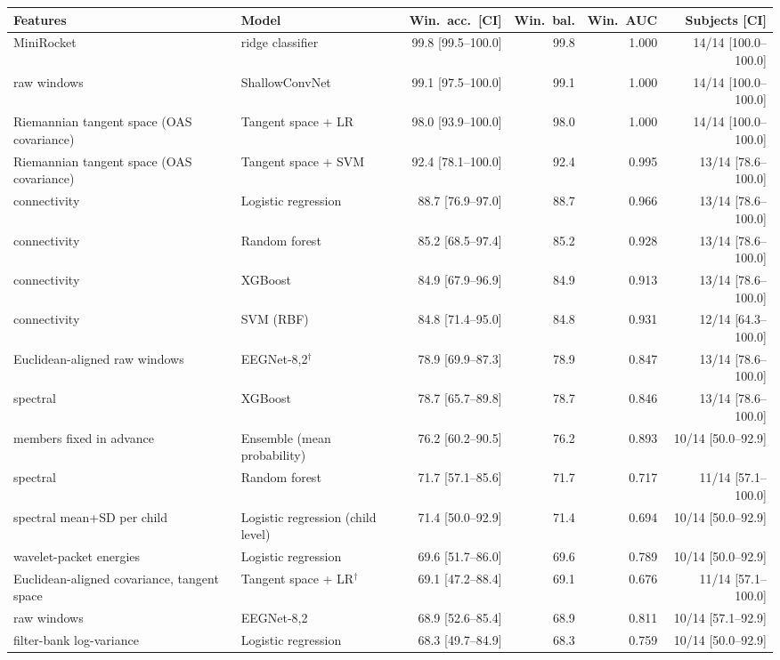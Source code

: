 \scriptsize
\begin{tabular}{llrrrr}
\hline
Features & Model & Win.\ acc.\ [CI] & Win.\ bal. & Win.\ AUC & Subjects [CI] \\
\hline
MiniRocket & ridge classifier & 99.8 [99.5--100.0] & 99.8 & 1.000 & 14/14 [100.0--100.0] \\
raw windows & ShallowConvNet & 99.1 [97.5--100.0] & 99.1 & 1.000 & 14/14 [100.0--100.0] \\
Riemannian tangent space (OAS covariance) & Tangent space + LR & 98.0 [93.9--100.0] & 98.0 & 1.000 & 14/14 [100.0--100.0] \\
Riemannian tangent space (OAS covariance) & Tangent space + SVM & 92.4 [78.1--100.0] & 92.4 & 0.995 & 13/14 [78.6--100.0] \\
connectivity & Logistic regression & 88.7 [76.9--97.0] & 88.7 & 0.966 & 13/14 [78.6--100.0] \\
connectivity & Random forest & 85.2 [68.5--97.4] & 85.2 & 0.928 & 13/14 [78.6--100.0] \\
connectivity & XGBoost & 84.9 [67.9--96.9] & 84.9 & 0.913 & 13/14 [78.6--100.0] \\
connectivity & SVM (RBF) & 84.8 [71.4--95.0] & 84.8 & 0.931 & 12/14 [64.3--100.0] \\
Euclidean-aligned raw windows & EEGNet-8,2$^\dagger$ & 78.9 [69.9--87.3] & 78.9 & 0.847 & 13/14 [78.6--100.0] \\
spectral & XGBoost & 78.7 [65.7--89.8] & 78.7 & 0.846 & 13/14 [78.6--100.0] \\
members fixed in advance & Ensemble (mean probability) & 76.2 [60.2--90.5] & 76.2 & 0.893 & 10/14 [50.0--92.9] \\
spectral & Random forest & 71.7 [57.1--85.6] & 71.7 & 0.717 & 11/14 [57.1--100.0] \\
spectral mean+SD per child & Logistic regression (child level) & 71.4 [50.0--92.9] & 71.4 & 0.694 & 10/14 [50.0--92.9] \\
wavelet-packet energies & Logistic regression & 69.6 [51.7--86.0] & 69.6 & 0.789 & 10/14 [50.0--92.9] \\
Euclidean-aligned covariance, tangent space & Tangent space + LR$^\dagger$ & 69.1 [47.2--88.4] & 69.1 & 0.676 & 11/14 [57.1--100.0] \\
raw windows & EEGNet-8,2 & 68.9 [52.6--85.4] & 68.9 & 0.811 & 10/14 [57.1--92.9] \\
filter-bank log-variance & Logistic regression & 68.3 [49.7--84.9] & 68.3 & 0.759 & 10/14 [50.0--92.9] \\

\end{tabular}
